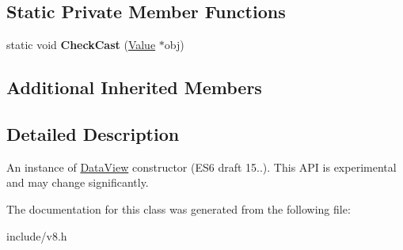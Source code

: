 \subsection*{Static Private Member Functions}
\begin{DoxyCompactItemize}
\item 
static void {\bfseries Check\+Cast} (\hyperlink{classv8_1_1_value}{Value} $\ast$obj)\hypertarget{classv8_1_1_data_view_ac7b128682169a4ac22395bfcbbb6b9f7}{}\label{classv8_1_1_data_view_ac7b128682169a4ac22395bfcbbb6b9f7}

\end{DoxyCompactItemize}
\subsection*{Additional Inherited Members}


\subsection{Detailed Description}
An instance of \hyperlink{classv8_1_1_data_view}{Data\+View} constructor (E\+S6 draft 15..). This A\+PI is experimental and may change significantly. 

The documentation for this class was generated from the following file\+:\begin{DoxyCompactItemize}
\item 
include/v8.\+h\end{DoxyCompactItemize}
